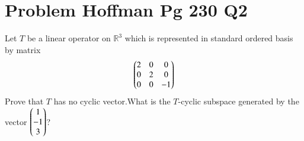 \documentclass[journal,12pt]{IEEEtran}
\begin{document}
\renewcommand{\thefigure}{\theenumi}
\renewcommand{\thetable}{\theenumi}

\section{\textbf{Problem Hoffman Pg 230 Q2}}
 Let $T$ be a linear operator on $\mathbb{R}^3$ which is represented in standard ordered basis by matrix\\
\begin{align}
    \begin{pmatrix}2&0&0\\0&2&0\\0&0&-1\end{pmatrix}
\end{align}
Prove that $T$ has no cyclic vector.What is the $T$-cyclic subspace generated by the vector $\begin{pmatrix}1\\-1\\3\end{pmatrix}$?\\ 
\end{document}
